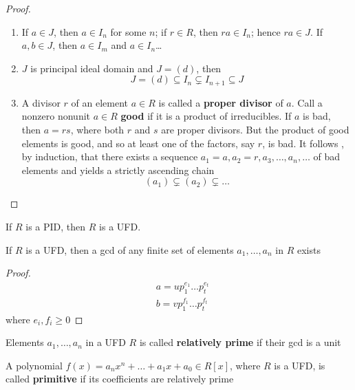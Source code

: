 \documentclass[11pt]{article}
\begin{document}
\begin{proof}
\begin{enumerate}
\item If \(a\in J\), then \(a\in I_n\) for some \(n\); if \(r\in R\), then 
\(ra\in I_n\); hence \(ra\in J\). If \(a,b\in J\), then \(a\in I_m\) and 
\(a\in I_n\)\ldots{}
\item \(J\) is principal ideal domain and \(J=(d)\), then
\begin{equation*}
J=(d)\subseteq I_n\subsetneq I_{n+1}\subseteq J
\end{equation*}
\item A divisor \(r\) of an element \(a\in R\) is called a \textbf{proper divisor} of \(a\).
Call a nonzero nonunit \(a\in R\) \textbf{good} if it is a product of irreducibles.
If \(a\) is bad, then \(a=rs\), where both \(r\) and \(s\) are proper
divisors. But the product of good elements is good, and so at least one of
the factors, say \(r\), is bad. It follows , by induction, that there exists
a sequence \(a_1=a,a_2=r,a_3,\dots,a_n,\dots\) of bad elements and yields
a strictly ascending chain
\begin{equation*}
(a_1)\subsetneq(a_2)\subsetneq\dots
\end{equation*}
\end{enumerate}
\end{proof}

\begin{theorem}[]
If \(R\) is a PID, then \(R\) is a UFD.
\end{theorem}

\begin{proposition}[]
If \(R\) is a UFD, then a gcd of any finite set of elements \(a_1,\dots, a_n\)
in \(R\) exists
\end{proposition}

\begin{proof}
\begin{align*}
&a=up_1^{e_1}\dots p_t^{e_t}\\
&b=vp_1^{f_1}\dots p_t^{f_t}
\end{align*}
where \(e_i,f_i\ge0\)
\end{proof}

\begin{definition}[]
Elements \(a_1,\dots,a_n\) in a UFD \(R\) is called \textbf{relatively prime} if their
gcd is a unit
\end{definition}

\begin{definition}[]
A polynomial \(f(x)=a_nx^n+\dots+a_1x+a_0\in R[x]\), where \(R\) is a UFD, is
called \textbf{primitive} if its coefficients are relatively prime
\end{definition}
\end{document}
